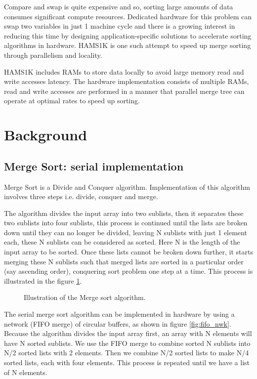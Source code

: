 \documentclass{article}
\begin{document}
Compare and swap is quite expensive and so, sorting large amounts of data consumes significant compute resources.  Dedicated hardware for this problem can swap two variables in just 1 machine cycle and there is a growing interest in reducing this time by designing application-specific solutions to accelerate sorting algorithms in hardware. HAMS1K is one such attempt to speed up merge sorting through parallelism and locality.

HAMS1K includes RAMs to store data locally to avoid large memory read and write accesses latency. The hardware implementation consists of multiple RAMs, read and write accesses are performed in a manner that parallel merge tree can operate at optimal rates to speed up sorting.  



\section{Background}

\subsection{Merge Sort: serial implementation}

Merge Sort is a Divide and Conquer algorithm. Implementation of this algorithm involves three steps i.e. divide, conquer and merge.

The algorithm divides the input array into two sublists, then it separates these two sublists into four sublists, this process is continued until the lists are broken down until they can no longer be divided, leaving N sublists with just 1 element each, these N sublists can be considered as sorted. Here N is the length of the input array to be sorted.
Once these lists cannot be broken down further, it starts merging these N sublists such that merged lists are sorted in a particular order (say ascending order), conquering sort problem one step at a time. This process is illustrated in the figure \ref{fig:merge_serial}.

\begin{figure}[H]
\centering
\caption{\label{fig:merge_serial}Illustration of the Merge sort algorithm.}
\end{figure}

The serial merge sort algorithm can be implemented in hardware by using a network (FIFO merge) of circular buffers, as shown in figure \ref{fig:fifo_nwk}. Because the algorithm divides the input array first, an array with N elements will have N sorted sublists. We use the FIFO merge to combine sorted N sublists into N/2 sorted lists with 2 elements. Then we combine N/2 sorted lists to make N/4 sorted lists, each with four elements. This process is repeated until we have a list of N elements.
\end{document}
